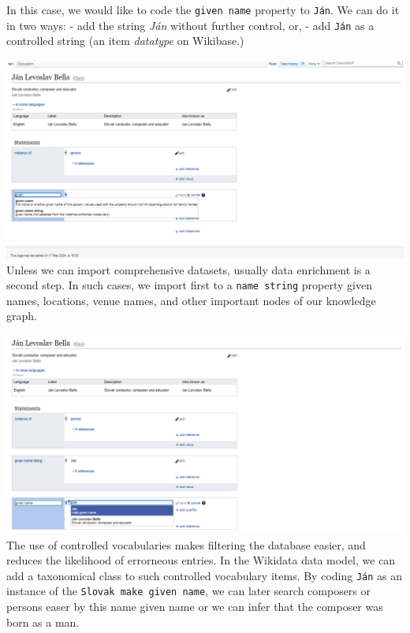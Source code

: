 \documentclass[
  letterpaper,
  DIV=11,
  numbers=noendperiod]{scrreprt}
\begin{document}
In this case, we would like to code the \texttt{given\ name} property to
\texttt{Ján}. We can do it in two ways: - add the string \emph{Ján}
without further control, or, - add \texttt{Ján} as a controlled string
(an item \emph{datatype} on Wikibase.)

\includegraphics{png/wikibase/edit/bella/bella_2.png} Unless we can
import comprehensive datasets, usually data enrichment is a second step.
In such cases, we import first to a \texttt{name\ string} property given
names, locations, venue names, and other important nodes of our
knowledge graph.

\includegraphics{png/wikibase/edit/bella/bella_3.png} The use of
controlled vocabularies makes filtering the database easier, and reduces
the likelihood of errorneous entries. In the Wikidata data model, we can
add a taxonomical class to such controlled vocabulary items. By coding
\texttt{Ján} as an instance of the \texttt{Slovak\ make\ given\ name},
we can later search composers or persons easer by this name given name
or we can infer that the composer was born as a man.
\end{document}
